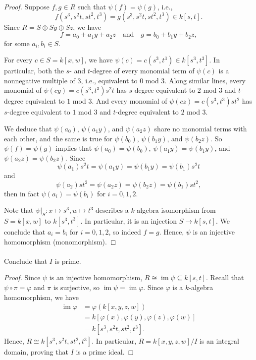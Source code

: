 \documentclass[12pt]{article}
\newlength{\myparskip}
\newenvironment{fullbox}{\begin{lrbox}{\savefullbox}\begin{minipage}{\dimexpr\textwidth-2\fboxsep\relax}\setlength{\parskip}{\myparskip}}{\end{minipage}\end{lrbox}\framebox[\textwidth]{\usebox{\savefullbox}}}
\newenvironment{pbox}[1][]{\begin{fullbox}\ifx#1\empty\else\paragraph{#1}\fi}{\end{fullbox}}
\newcommand{\isp}[1]{\quad\text{#1}\quad}
\renewcommand{\phi}{\varphi}
\newcommand{\<}{\langle}
\renewcommand{\>}{\rangle}
\newcommand{\isom}{\cong}
\DeclareMathOperator{\im}{im}
\begin{document}
\begin{proof}
    Suppose $f, g \in R$ such that $\psi(f) = \psi(g)$, i.e.,
    \[
        f(s^3, s^2t, st^2, t^3) = g(s^3, s^2t, st^2, t^3) \in k[s, t].
    \]
    Since $R = S \oplus Sy \oplus Sz$, we have
    \[
        f = a_0 + a_1y + a_2z
        \isp{and}
        g = b_0 + b_1y + b_2z,
    \]
    for some $a_i, b_i \in S$.
    
    For every $c \in S = k[x, w]$, we have $\psi(c) = c(s^3, t^3) \in k[s^3, t^3]$. In particular, both the $s$- and $t$-degree of every monomial term of $\psi(c)$ is a nonnegative multiple of $3$, i.e., equivalent to $0$ mod $3$. Along similar lines, every monomial of $\psi(cy) = c(s^3, t^3)s^2t$ has $s$-degree equivalent to $2$ mod $3$ and $t$-degree equivalent to $1$ mod $3$. And every monomial of $\psi(cz) = c(s^3, t^3)st^2$ has $s$-degree equivalent to $1$ mod $3$ and $t$-degree equivalent to $2$ mod $3$.

    We deduce that $\psi(a_0)$, $\psi(a_1y)$, and $\psi(a_2z)$ share no monomial terms with each other, and the same is true for $\psi(b_0)$, $\psi(b_1y)$, and $\psi(b_2z)$. So $\psi(f) = \psi(g)$ implies that $\psi(a_0) = \psi(b_0)$, $\psi(a_1y) = \psi(b_1y)$, and $\psi(a_2z) = \psi(b_2z)$. Since
    \[
        \psi(a_1)s^2t = \psi(a_1y) = \psi(b_1y) = \psi(b_1)s^2t
    \]
    and
    \[
        \psi(a_2)st^2 = \psi(a_2z) = \psi(b_2z) = \psi(b_1)st^2,
    \]
    then in fact $\psi(a_i) = \psi(b_i)$ for $i = 0, 1, 2$.
    
    Note that $\psi|_S : x \mapsto s^3, w \mapsto t^3$ describes a $k$-algebra isomorphism from $S = k[x, w]$ to $k[s^3, t^3]$. In particular, it is an injection $S \to k[s, t]$. We conclude that $a_i = b_i$ for $i = 0, 1, 2$, so indeed $f = g$. Hence, $\psi$ is an injective homomorphism (monomorphism).

\end{proof}

\begin{pbox}
    Conclude that $I$ is prime.
\end{pbox}

\begin{proof}
    Since $\psi$ is an injective homomorphism, $R \isom \im\psi \subseteq k[s, t]$. Recall that $\psi \circ \pi = \phi$ and $\pi$ is surjective, so $\im\psi = \im\phi$. Since $\phi$ is a $k$-algebra homomorphism, we have
    \begin{align*}
        \im\phi
            &= \phi(k[x, y, z, w]) \\
            &= k[\phi(x), \phi(y), \phi(z), \phi(w)] \\
            &= k[s^3, s^2t, st^2, t^3].
    \end{align*}
    Hence, $R \isom k[s^3, s^2t, st^2, t^3]$. In particular, $R = k[x, y, z, w]/I$ is an integral domain, proving that $I$ is a prime ideal.
    
\end{proof}
\end{document}
